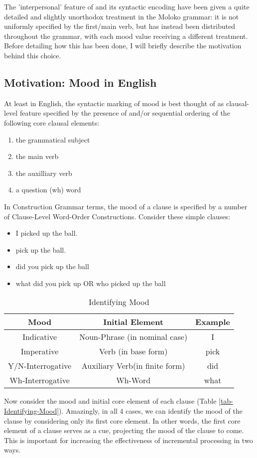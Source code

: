  

The 'interpersonal' feature of  and its syntactic encoding have been given a quite detailed and slightly unorthodox treatment in the Moloko grammar: it is not uniformly specified by the first/main verb, but  has instead been distributed throughout the grammar, with each mood value receiving a different treatment. Before detailing how this has been done, I will briefly describe the motivation behind this choice.

\subsection{Motivation: Mood in English}

At least in English, the syntactic marking of mood is best thought of as clausal-level feature specified by the presence of and/or sequential ordering of the following core clausal elements: 
\begin{enumerate}
\item the grammatical subject
\item the main verb
\item the auxilliary verb
\item a question (wh) word
\end{enumerate}
In Construction Grammar terms, the mood of a clause is specified by a number of Clause-Level Word-Order Constructions. Consider these simple clauses:
\begin{itemize}
\item I picked up the ball.
\item pick up the ball.
\item did you pick up the ball
\item what did you pick up OR who picked up the ball
\end{itemize}

\begin{table}[htdp]
\caption{Identifying Mood}
\begin{center}
\begin{tabular}{|c|c|c|}
\hline
\textbf{Mood}&\textbf{Initial Element}&\textbf{Example}\\ \hline
Indicative&Noun-Phrase (in nominal case)&I\\ \hline
Imperative&Verb (in base form)&pick\\ \hline
Y/N-Interrogative&Auxiliary Verb(in finite form)&did\\ \hline
Wh-Interrogative&Wh-Word&what \\ 
\hline
\end{tabular}
\end{center}
\label{tab-Identifying-Mood }
\end{table}%
Now consider the mood and initial core element of each clause (Table \ref{tab-Identifying-Mood}). Amazingly, in all 4 cases, we can identify the mood of the clause by considering only its first core element. In other words, the first core element of a clause serves as a cue, projecting the mood of the clause to come. This is important for increasing the effectiveness of incremental processing in two ways. 

